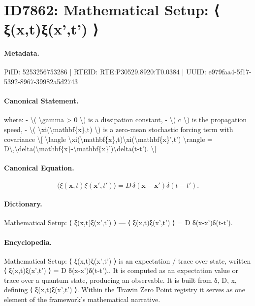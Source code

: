 \section*{ID7862: Mathematical Setup: ⟨ ξ(x,t)ξ(x',t') ⟩}
\paragraph{Metadata.}
PiID: 5253256753286 | RTEID: RTE:P30529.8920:T0.0384 | UUID: e979faa4-5f17-5392-8967-39982a5d2743

\paragraph{Canonical Statement.}
where: - \textbackslash{}( \textbackslash{}gamma > 0 \textbackslash{}) is a dissipation constant, - \textbackslash{}( c \textbackslash{}) is the propagation speed, - \textbackslash{}( \textbackslash{}xi(\textbackslash{}mathbf\{x\},t) \textbackslash{}) is a zero-mean stochastic forcing term with covariance \textbackslash{}[ \textbackslash{}langle \textbackslash{}xi(\textbackslash{}mathbf\{x\},t)\textbackslash{}xi(\textbackslash{}mathbf\{x\}',t') \textbackslash{}rangle = D\textbackslash{},\textbackslash{}delta(\textbackslash{}mathbf\{x\}-\textbackslash{}mathbf\{x\}')\textbackslash{}delta(t-t'). \textbackslash{}]

\paragraph{Canonical Equation.}
\[
\langle \xi(\mathbf{x},t)\xi(\mathbf{x}',t') \rangle = D\,\delta(\mathbf{x}-\mathbf{x}')\delta(t-t').
\]

\paragraph{Dictionary.}
Mathematical Setup: ⟨ ξ(x,t)ξ(x',t') ⟩ — ⟨ ξ(x,t)ξ(x',t') ⟩ = D δ(x-x')δ(t-t').

\paragraph{Encyclopedia.}
Mathematical Setup: ⟨ ξ(x,t)ξ(x',t') ⟩ is an expectation / trace over state, written ⟨ ξ(x,t)ξ(x',t') ⟩ = D δ(x-x')δ(t-t').. It is computed as an expectation value or trace over a quantum state, producing an observable. It is built from δ, D, x, defining ⟨ ξ(x,t)ξ(x',t') ⟩. Within the Trawin Zero Point registry it serves as one element of the framework's mathematical narrative.
